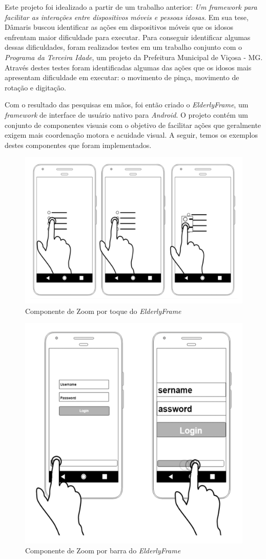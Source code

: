 \documentclass[
	12pt,				    %
	openright,			    %
	oneside,			    %
	a4paper,			    %
    sumario=tradicional,    %
	english,			    %
	brazil,				    %
	]{abntex2}              %
\begin{document}
\par

Este projeto foi idealizado a partir de um trabalho anterior: \textit{Um framework para facilitar as interações entre dispositivos móveis e pessoas idosas}\cite{tesedamaris}. Em sua tese, Dâmaris buscou identificar as ações em dispositivos móveis que os idosos enfrentam maior dificuldade para executar. Para conseguir identificar algumas dessas dificuldades, foram realizados testes em um trabalho conjunto com o \emph{Programa da Terceira Idade}, um projeto da Prefeitura Municipal de Viçosa - MG. Através destes testes foram identificadas algumas das ações que os idosos mais apresentam dificuldade em executar: o movimento de pinça, movimento de rotação e digitação.

\par

Com o resultado das pesquisas em mãos, foi então criado o \textit{ElderlyFrame}\cite{elderlyframe}, um \textit{framework} de interface de usuário nativo para \textit{Android}. O projeto contém um conjunto de componentes visuais com o objetivo de facilitar ações que geralmente exigem mais coordenação motora e acuidade visual. A seguir, temos os exemplos destes componentes que foram implementados.

\begin{figure}[H]
	\begin{center}
		\includegraphics[height=0.4\linewidth]{touchable-zoom.png}
	\end{center}
	\caption[Touchable Zoom]{Componente de Zoom por toque do \textit{ElderlyFrame}}
	\label{fig:touchableZoom}
\end{figure}

\begin{figure}[H]
	\begin{center}
		\includegraphics[height=0.5\linewidth]{zoom-bar.png}
	\end{center}
	\caption[Componente de zoom com barra]{Componente de Zoom por barra do \textit{ElderlyFrame}}
	\label{fig:zoomBar}
\end{figure}
\end{document}
